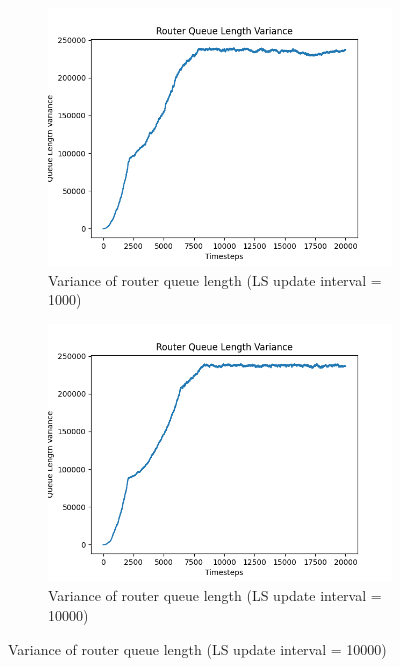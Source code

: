    \begin{figure}[H]\ContinuedFloat
        \begin{subfigure}{0.475\textwidth}
            \includegraphics[width=\textwidth]{figs/appendix/variance_ls=1000.png}
            \caption[]{Variance of router queue length (LS update interval = 1000)}
            \label{fig:qvar-1000}
        \end{subfigure}
        \hfill
        \begin{subfigure}[H]{0.475\textwidth}
            \includegraphics[width=\textwidth]{figs/appendix/variance_ls=10000.png}
            \caption[]{Variance of router queue length (LS update interval = 10000)}
            \label{fig:qvar-10000}
        \end{subfigure}
    \end{figure}

